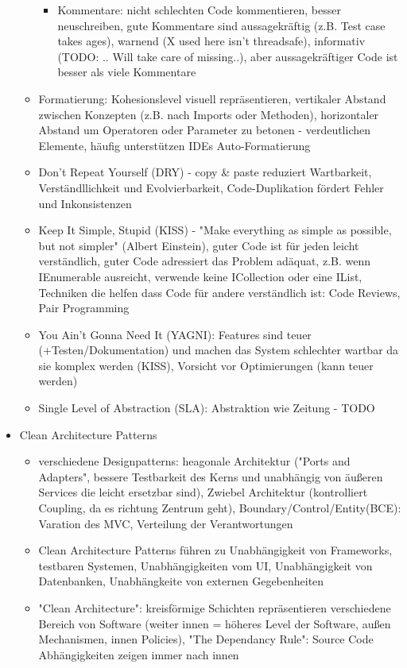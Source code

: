 \documentclass[paper=a4, fontsize=11pt]{scrartcl} %
\numberwithin{equation}{section} %
\numberwithin{figure}{section} %
\numberwithin{table}{section} %
\begin{document}
\begin{itemize}
\begin{itemize}
\begin{itemize}
      \item Kommentare: nicht schlechten Code kommentieren, besser neuschreiben, gute Kommentare sind aussagekräftig (z.B. Test case takes ages), warnend (X used here isn't threadsafe), informativ (TODO: .. Will take care of missing..), aber aussagekräftiger Code ist besser als viele Kommentare
    \end{itemize}
    \item Formatierung: Kohesionslevel visuell repräsentieren, vertikaler Abstand zwischen Konzepten (z.B. nach Imports oder Methoden), horizontaler Abstand um Operatoren oder Parameter zu betonen - verdeutlichen Elemente, häufig unterstützen IDEs Auto-Formatierung
    \item Don't Repeat Yourself (DRY) - copy \& paste reduziert Wartbarkeit, Verständllichkeit und Evolvierbarkeit, Code-Duplikation fördert Fehler und Inkonsistenzen
    \item Keep It Simple, Stupid (KISS) - "Make everything as simple as possible, but not simpler" (Albert Einstein), guter Code ist für jeden leicht verständlich, guter Code adressiert das Problem adäquat, z.B. wenn IEnumerable ausreicht, verwende keine ICollection oder eine IList, Techniken die helfen dass Code für andere verständlich ist: Code Reviews, Pair Programming
    \item You Ain't Gonna Need It (YAGNI): Features sind teuer (+Testen/Dokumentation) und machen das System schlechter wartbar da sie komplex werden (KISS), Vorsicht vor Optimierungen (kann teuer werden)
    \item Single Level of Abstraction (SLA): Abstraktion wie Zeitung - TODO
  \end{itemize}
  \item Clean Architecture Patterns
  \begin{itemize}
    \item verschiedene Designpatterns: heagonale Architektur ("Ports and Adapters", bessere Testbarkeit des Kerns und unabhängig von äußeren Services die leicht ersetzbar sind), Zwiebel Architektur (kontrolliert Coupling, da es richtung Zentrum geht), Boundary/Control/Entity(BCE): Varation des MVC, Verteilung der Verantwortungen
    \item Clean Architecture Patterns führen zu Unabhängigkeit von Frameworks, testbaren Systemen, Unabhängigkeiten vom UI, Unabhängigkeit von Datenbanken, Unabhängkeite von externen Gegebenheiten
    \item "Clean Architecture": kreisförmige Schichten repräsentieren verschiedene Bereich von Software (weiter innen = höheres Level der Software, außen Mechanismen, innen Policies), "The Dependancy Rule": Source Code Abhängigkeiten zeigen immer nach innen

\end{itemize}
\end{itemize}
\end{document}
